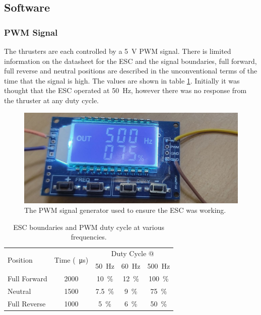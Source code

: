 	\subsection{Software}
	\subsubsection{PWM Signal}
	The thrusters are each controlled by a \SI{5}{\volt} PWM signal. There is limited information on the datasheet for the ESC and the signal boundaries, full forward, full reverse and neutral positions are described in the unconventional terms of the time that the signal is high. The values are shown in table \ref{tab:3:PWM}. Initially it was thought that the ESC operated at \SI{50}{\hertz}, however there was no response from the thruster at any duty cycle.\par
	\begin{figure}[!hb]
		\begin{center}
			\includegraphics[width=0.31\linewidth]{figures/pwmGen.jpg}
			\caption{The PWM signal generator used to ensure the ESC was working.}
			\label{fig:3:PWMgen}
		\end{center}
	\end{figure}
	\begin{table}[!ht]
		\begin{center}
			\caption{ESC boundaries and PWM duty cycle at various frequencies.}
			\label{tab:3:PWM}
			\begin{tabular}{|l|c|c|c|c|}
				\hline
				\multirow{2}{*}{Position} & \multirow{2}{*}{Time (\SI{}{\micro\second})} & \multicolumn{3}{c|}{Duty Cycle @}\\
				& & \multicolumn{1}{c}{\SI{50}{\hertz}} & \multicolumn{1}{c}{\SI{60}{\hertz}} & \multicolumn{1}{c|}{\SI{500}{\hertz}}\\
				\hline
				Full Forward & 2000 & \SI{10}{\percent} & \SI{12}{\percent} & \SI{100}{\percent}  \\
				\hline
				Neutral & 1500 & \SI{7.5}{\percent} & \SI{9}{\percent} & \SI{75}{\percent}  \\
				\hline
				Full Reverse & 1000 & \SI{5}{\percent} & \SI{6}{\percent} & \SI{50}{\percent}  \\
				\hline
			\end{tabular}
		\end{center}
	\end{table}
